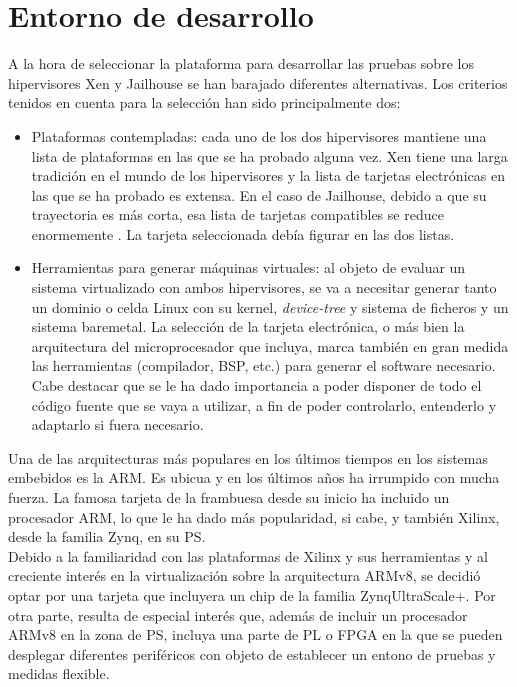 \chapter{Entorno de desarrollo}

A la hora de seleccionar la plataforma para desarrollar las pruebas sobre los hipervisores Xen y Jailhouse se han barajado diferentes alternativas. Los criterios tenidos en cuenta para la selección han sido principalmente dos:
\begin{itemize}
  \item Plataformas contempladas: cada uno de los dos hipervisores mantiene una lista de plataformas en las que se ha probado alguna vez. Xen tiene una larga tradición en el mundo de los hipervisores y la lista de tarjetas electrónicas en las que se ha probado es extensa. En el caso de Jailhouse, debido a que su trayectoria es más corta, esa lista de tarjetas compatibles se reduce enormemente \cite{jailhouse_github}. La tarjeta seleccionada debía figurar en las dos listas.
  \item Herramientas para generar máquinas virtuales: al objeto de evaluar un sistema virtualizado con ambos hipervisores, se va a necesitar generar tanto un dominio o celda Linux con su kernel, \textit{device-tree} y sistema de ficheros y un sistema baremetal. La selección de la tarjeta electrónica, o más bien la arquitectura del microprocesador que incluya, marca también en gran medida las herramientas (compilador, BSP, etc.) para generar el software necesario. Cabe destacar que se le ha dado importancia a poder disponer de todo el código fuente que se vaya a utilizar, a fin de poder controlarlo, entenderlo y adaptarlo si fuera necesario.
\end{itemize}

Una de las arquitecturas más populares en los últimos tiempos en los sistemas embebidos es la ARM. Es ubicua y en los últimos años ha irrumpido con mucha fuerza. La famosa tarjeta de la frambuesa desde su inicio ha incluido un procesador ARM, lo que le ha dado más popularidad, si cabe, y también Xilinx, desde la familia Zynq, en su PS.\\
Debido a la familiaridad con las plataformas de Xilinx y sus herramientas y al creciente interés en la virtualización sobre la arquitectura ARMv8, se decidió optar por una tarjeta que incluyera un chip de la familia Zynq\textregistered UltraScale+\texttrademark. Por otra parte, resulta de especial interés que, además de incluir un procesador ARMv8 en la zona de PS, incluya una parte de \acrshort{PL} o \acrshort{FPGA} en la que se pueden desplegar diferentes periféricos con objeto de establecer un entono de pruebas y medidas flexible.

